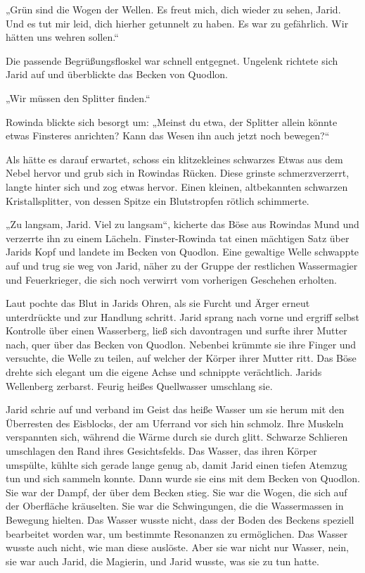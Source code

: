 „Grün sind die Wogen der Wellen. Es freut mich, dich wieder zu sehen, Jarid. Und es tut mir leid, dich hierher getunnelt zu haben. Es war zu gefährlich. Wir hätten uns wehren sollen.“

Die passende Begrüßungsfloskel war schnell entgegnet. Ungelenk richtete sich Jarid auf und überblickte das Becken von Quodlon.

„Wir müssen den Splitter finden.“

Rowinda blickte sich besorgt um: „Meinst du etwa, der Splitter allein könnte etwas Finsteres anrichten? Kann das Wesen ihn auch jetzt noch bewegen?“

Als hätte es darauf erwartet, schoss ein klitzekleines schwarzes Etwas aus dem Nebel hervor und grub sich in Rowindas Rücken. Diese grinste schmerzverzerrt, langte hinter sich und zog etwas hervor. Einen kleinen, altbekannten schwarzen Kristallsplitter, von dessen Spitze ein Blutstropfen rötlich schimmerte.

„Zu langsam, Jarid. Viel zu langsam“, kicherte das Böse aus Rowindas Mund und verzerrte ihn zu einem Lächeln. Finster-Rowinda tat einen mächtigen Satz über Jarids Kopf und landete im Becken von Quodlon. Eine gewaltige Welle schwappte auf und trug sie weg von Jarid, näher zu der Gruppe der restlichen Wassermagier und Feuerkrieger, die sich noch verwirrt vom vorherigen Geschehen erholten.

Laut pochte das Blut in Jarids Ohren, als sie Furcht und Ärger erneut unterdrückte und zur Handlung schritt. Jarid sprang nach vorne und ergriff selbst Kontrolle über einen Wasserberg, ließ sich davontragen und surfte ihrer Mutter nach, quer über das Becken von Quodlon. Nebenbei krümmte sie ihre Finger und versuchte, die Welle zu teilen, auf welcher der Körper ihrer Mutter ritt. Das Böse drehte sich elegant um die eigene Achse und schnippte verächtlich. Jarids Wellenberg zerbarst. Feurig heißes Quellwasser umschlang sie.

Jarid schrie auf und verband im Geist das heiße Wasser um sie herum mit den Überresten des Eisblocks, der am Uferrand vor sich hin schmolz. Ihre Muskeln verspannten sich, während die Wärme durch sie durch glitt. Schwarze Schlieren umschlagen den Rand ihres Gesichtsfelds. Das Wasser, das ihren Körper umspülte, kühlte sich gerade lange genug ab, damit Jarid einen tiefen Atemzug tun und sich sammeln konnte. Dann wurde sie eins mit dem Becken von Quodlon. Sie war der Dampf, der über dem Becken stieg. Sie war die Wogen, die sich auf der Oberfläche kräuselten. Sie war die Schwingungen, die die Wassermassen in Bewegung hielten. Das Wasser wusste nicht, dass der Boden des Beckens speziell bearbeitet worden war, um bestimmte Resonanzen zu ermöglichen. Das Wasser wusste auch nicht, wie man diese auslöste. Aber sie war nicht nur Wasser, nein, sie war auch Jarid, die Magierin, und Jarid wusste, was sie zu tun hatte.

